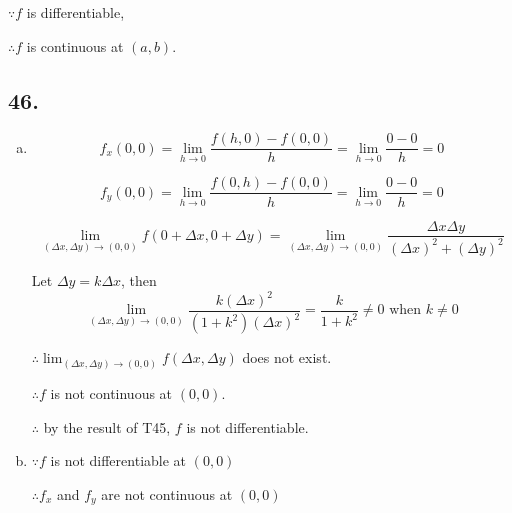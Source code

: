 \documentclass{article}
\begin{document}
    $\because f$ is differentiable,

    $\therefore f$ is continuous at $(a, b)$.

    \subsection*{46.}

    \begin{enumerate}[(a)]
        \item 

        $$f_x(0, 0) = \lim_{h \to 0}\frac{f(h, 0) - f(0, 0)}{h} = \lim_{h \to 0}\frac{0 - 0}{h} = 0$$

        $$f_y(0, 0) = \lim_{h \to 0}\frac{f(0, h) - f(0, 0)}{h} = \lim_{h \to 0}\frac{0 - 0}{h} = 0$$

        $$\lim_{(\Delta x, \Delta y) \to (0, 0)}f(0 + \Delta x, 0 + \Delta y) = \lim_{(\Delta x, \Delta y) \to (0, 0)}\frac{\Delta x \Delta y}{(\Delta x)^2 + (\Delta y)^2}$$

        Let $\Delta y = k\Delta x$, then $$\lim_{(\Delta x, \Delta y) \to (0, 0)}\frac{k(\Delta x)^2}{(1+k^2)(\Delta x)^2} = \frac{k}{1 + k^2} \not = 0\textrm{ when } k \not = 0$$

        $\therefore \lim_{(\Delta x, \Delta y) \to (0, 0)}f(\Delta x, \Delta y)$ does not exist.

        $\therefore f$ is not continuous at $(0, 0)$.

        $\therefore$ by the result of T45, $f$ is not differentiable.

        \item 

        $\because f$ is not differentiable at $(0, 0)$

        $\therefore f_x$ and $f_y$ are not continuous at $(0, 0)$
    \end{enumerate}
\end{document}
